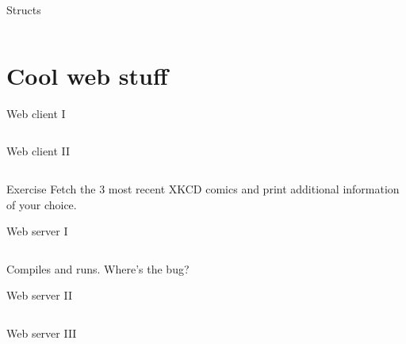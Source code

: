 \documentclass[10pt]{beamer}
\begin{document}
	
	\begin{frame}[t,fragile]{Structs}
		\inputminted{go}{code/09_structs.go}
	\end{frame}

	
	\section{Cool web stuff}
			
	
	\begin{frame}[t,fragile]{Web client I}
		\inputminted[fontsize=\footnotesize]{go}{code/10_xkcd.go}
	\end{frame}
				
	
	\begin{frame}[t,fragile]{Web client II}
		\inputminted{go}{code/10b_xkcd.go}
	\end{frame}
	
	
	\begin{frame}[fragile]{Exercise}
		Fetch the 3 most recent XKCD comics and print additional information of your choice.
	\end{frame}
					
	
	\begin{frame}[t,fragile]{Web server I}
		\inputminted{go}{code/11_server.go}
		\pause
		Compiles and runs. Where's the bug?
	\end{frame}
					
	
	\begin{frame}[t,fragile]{Web server II}
		\inputminted{go}{code/12_mutex.go}
	\end{frame}
						
	
	\begin{frame}[t,fragile]{Web server III}
		\inputminted{go}{code/13_atomic.go}
	\end{frame}
	
\end{document}
